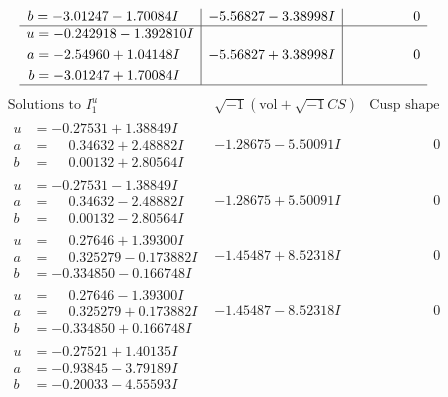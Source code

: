 \documentclass[1p]{elsarticle_modified}
\theoremstyle{definition}
\newcommand{\I}{\sqrt{-1}}
\begin{document}
$$\begin{array}{c|c|c}
\begin{aligned}
b &= -3.01247 - 1.70084 I\end{aligned}
 & -5.56827 - 3.38998 I & \phantom{-0.000000 } 0 \\ \hline\begin{aligned}
u &= -0.242918 - 1.392810 I \\
a &= -2.54960 + 1.04148 I \\
b &= -3.01247 + 1.70084 I\end{aligned}
 & -5.56827 + 3.38998 I & \phantom{-0.000000 } 0\\
 \hline 
 \end{array}$$\newpage$$\begin{array}{c|c|c}  
\text{Solutions to }I^u_{1}& \I (\text{vol} + \sqrt{-1}CS) & \text{Cusp shape}\\
 \hline 
\begin{aligned}
u &= -0.27531 + 1.38849 I \\
a &= \phantom{-}0.34632 + 2.48882 I \\
b &= \phantom{-}0.00132 + 2.80564 I\end{aligned}
 & -1.28675 - 5.50091 I & \phantom{-0.000000 } 0 \\ \hline\begin{aligned}
u &= -0.27531 - 1.38849 I \\
a &= \phantom{-}0.34632 - 2.48882 I \\
b &= \phantom{-}0.00132 - 2.80564 I\end{aligned}
 & -1.28675 + 5.50091 I & \phantom{-0.000000 } 0 \\ \hline\begin{aligned}
u &= \phantom{-}0.27646 + 1.39300 I \\
a &= \phantom{-}0.325279 - 0.173882 I \\
b &= -0.334850 - 0.166748 I\end{aligned}
 & -1.45487 + 8.52318 I & \phantom{-0.000000 } 0 \\ \hline\begin{aligned}
u &= \phantom{-}0.27646 - 1.39300 I \\
a &= \phantom{-}0.325279 + 0.173882 I \\
b &= -0.334850 + 0.166748 I\end{aligned}
 & -1.45487 - 8.52318 I & \phantom{-0.000000 } 0 \\ \hline\begin{aligned}
u &= -0.27521 + 1.40135 I \\
a &= -0.93845 - 3.79189 I \\
b &= -0.20033 - 4.55593 I\end{aligned}

\end{array}$$
\end{document}
